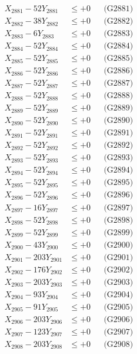 \documentclass[a4paper,10pt]{article}
\begin{document}
{\begin{align}
X_{2881} - 52Y_{2881} &\leq +0 && \text{(G2881)} \\
X_{2882} - 38Y_{2882} &\leq +0 && \text{(G2882)} \\
X_{2883} - 6Y_{2883} &\leq +0 && \text{(G2883)} \\
X_{2884} - 52Y_{2884} &\leq +0 && \text{(G2884)} \\
X_{2885} - 52Y_{2885} &\leq +0 && \text{(G2885)} \\
X_{2886} - 52Y_{2886} &\leq +0 && \text{(G2886)} \\
X_{2887} - 52Y_{2887} &\leq +0 && \text{(G2887)} \\
X_{2888} - 52Y_{2888} &\leq +0 && \text{(G2888)} \\
X_{2889} - 52Y_{2889} &\leq +0 && \text{(G2889)} \\
X_{2890} - 52Y_{2890} &\leq +0 && \text{(G2890)} \\
\allowbreak
X_{2891} - 52Y_{2891} &\leq +0 && \text{(G2891)} \\
X_{2892} - 52Y_{2892} &\leq +0 && \text{(G2892)} \\
X_{2893} - 52Y_{2893} &\leq +0 && \text{(G2893)} \\
X_{2894} - 52Y_{2894} &\leq +0 && \text{(G2894)} \\
X_{2895} - 52Y_{2895} &\leq +0 && \text{(G2895)} \\
X_{2896} - 52Y_{2896} &\leq +0 && \text{(G2896)} \\
X_{2897} - 16Y_{2897} &\leq +0 && \text{(G2897)} \\
X_{2898} - 52Y_{2898} &\leq +0 && \text{(G2898)} \\
X_{2899} - 52Y_{2899} &\leq +0 && \text{(G2899)} \\
X_{2900} - 43Y_{2900} &\leq +0 && \text{(G2900)} \\
\allowbreak
X_{2901} - 203Y_{2901} &\leq +0 && \text{(G2901)} \\
X_{2902} - 176Y_{2902} &\leq +0 && \text{(G2902)} \\
X_{2903} - 203Y_{2903} &\leq +0 && \text{(G2903)} \\
X_{2904} - 93Y_{2904} &\leq +0 && \text{(G2904)} \\
X_{2905} - 91Y_{2905} &\leq +0 && \text{(G2905)} \\
X_{2906} - 203Y_{2906} &\leq +0 && \text{(G2906)} \\
X_{2907} - 123Y_{2907} &\leq +0 && \text{(G2907)} \\
X_{2908} - 203Y_{2908} &\leq +0 && \text{(G2908)} \\

\end{align}}
\end{document}
